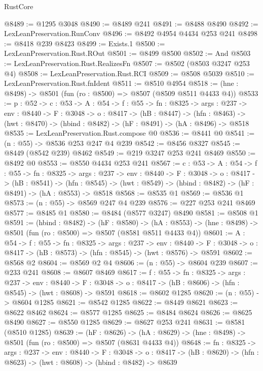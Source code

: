 \begin{lexlean}{RustCore}
\begin{coremodule}
@8489 := @1295 @3048
@8490 := @8489 @241
@8491 := @8488 @8490
@8492 := LexLeanPreservation.RunConv
@8496 := @8492 @4954 @4434 @253 @241
@8498 := @8418 @239 @8423
@8499 := Exists.{1}
@8500 := LexLeanPreservation.Rust.ROut
@8501 := @8499 @8500
@8502 := And
@8503 := LexLeanPreservation.Rust.RealizesFn
@8507 := @8502 (@8503 @3247 @253 @4)
@8508 := LexLeanPreservation.Rust.RCI
@8509 := @8508 @5039
@8510 := LexLeanPreservation.Rust.fnIdent
@8511 := @8510 @4954
@8518 := (hne : @8498) -> @8501 (fun (ro : @8500) => @8507 (@8509 @8511 @4433 @4))
@8533 := {p : @52} ->
  {c : @53} ->
  {A : @54} ->
  {f : @55} ->
  {fn : @8325} ->
  {args : @237} ->
  {env : @8440} ->
  {F : @3048} ->
  {o : @8417} ->
  (hB : @8447) ->
  (hfn : @8463) -> (hwt : @8470) -> (hbind : @8482) -> (hF : @8491) -> (hA : @8496) -> @8518
@8535 := LexLeanPreservation.Rust.compose @0
@8536 := @8441 @0
@8541 := (n : @55) -> @8536 @253 @247 @4 @239
@8542 := @8456 @8327
@8545 := @8449 (@8542 @239) @8462
@8549 := @219 @3247 @253 @241 @8469
@8550 := @8492 @0
@8553 := @8550 @4434 @253 @241
@8567 := {c : @53} ->
  {A : @54} ->
  {f : @55} ->
  {fn : @8325} ->
  {args : @237} ->
  {env : @8440} ->
  {F : @3048} ->
  {o : @8417} ->
  (hB : @8541) ->
  (hfn : @8545) -> (hwt : @8549) -> (hbind : @8482) -> (hF : @8491) -> (hA : @8553) -> @8518
@8568 := @8535 @1
@8569 := @8536 @1
@8573 := (n : @55) -> @8569 @247 @4 @239
@8576 := @227 @253 @241 @8469
@8577 := @8485 @1
@8580 := @8484 (@8577 @3247) @8490
@8581 := @8508 @1
@8591 := (hbind : @8482) ->
  (hF : @8580) ->
  (hA : @8553) -> (hne : @8498) -> @8501 (fun (ro : @8500) => @8507 (@8581 @8511 @4433 @4))
@8601 := {A : @54} ->
  {f : @55} ->
  {fn : @8325} ->
  {args : @237} ->
  {env : @8440} ->
  {F : @3048} -> {o : @8417} -> (hB : @8573) -> (hfn : @8545) -> (hwt : @8576) -> @8591
@8602 := @8568 @2
@8604 := @8569 @2 @4
@8606 := (n : @55) -> @8604 @239
@8607 := @233 @241
@8608 := @8607 @8469
@8617 := {f : @55} ->
  {fn : @8325} ->
  {args : @237} ->
  {env : @8440} ->
  {F : @3048} -> {o : @8417} -> (hB : @8606) -> (hfn : @8545) -> (hwt : @8608) -> @8591
@8618 := @8602 @1285
@8620 := (n : @55) -> @8604 @1285
@8621 := @8542 @1285
@8622 := @8449 @8621
@8623 := @8622 @8462
@8624 := @8577 @1285
@8625 := @8484 @8624
@8626 := @8625 @8490
@8627 := @8550 @1285
@8629 := @8627 @253 @241
@8631 := @8581 (@8510 @1285)
@8639 := (hF : @8626) ->
  (hA : @8629) -> (hne : @8498) -> @8501 (fun (ro : @8500) => @8507 (@8631 @4433 @4))
@8648 := {fn : @8325} ->
  {args : @237} ->
  {env : @8440} ->
  {F : @3048} ->
  {o : @8417} -> (hB : @8620) -> (hfn : @8623) -> (hwt : @8608) -> (hbind : @8482) -> @8639

\end{coremodule}
\end{lexlean}
